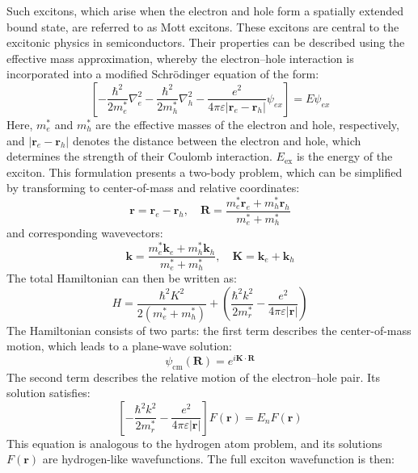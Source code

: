 Such excitons, which arise when the electron and hole form a spatially extended bound state, are referred to as Mott excitons. These excitons are central to the excitonic physics in semiconductors. Their properties can be described using the effective mass approximation, whereby the electron–hole interaction is incorporated into a modified Schrödinger equation of the form:
\begin{equation}
	\left[- \frac{\hbar^2}{2m_e^*} \nabla_e^2 - \frac{\hbar^2}{2m_h^*} \nabla_h^2 - \frac{e^2}{4\pi \varepsilon | \mathbf{r}_e - \mathbf{r}_h |} \psi_{ex} \right] = E \psi_{ex}
\end{equation}
Here, \( m_e^* \) and \( m_h^* \) are the effective masses of the electron and hole, respectively, and \( |\mathbf{r}_e - \mathbf{r}_h| \) denotes the distance between the electron and hole, which determines the strength of their Coulomb interaction. \( E_{\text{ex}} \) is the energy of the exciton.
This formulation presents a two-body problem, which can be simplified by transforming to center-of-mass and relative coordinates:
\begin{equation}
	\mathbf{r} = \mathbf{r}_e - \mathbf{r}_h, \quad \mathbf{R} = \frac{m_e^* \mathbf{r}_e + m_h^* \mathbf{r}_h}{m_e^* + m_h^*}
\end{equation}
and corresponding wavevectors:
\begin{equation}
	\mathbf{k} = \frac{m_e^* \mathbf{k}_e + m_h^* \mathbf{k}_h}{m_e^* + m_h^*}, \quad \mathbf{K} = \mathbf{k}_e + \mathbf{k}_h
\end{equation}
The total Hamiltonian can then be written as:
\begin{equation}
	H = \frac{\hbar^2 K^2}{2(m_e^* + m_h^*)} +  \left( \frac{\hbar^2 k^2}{2 m_r^*} - \frac{e^2}{4\pi \varepsilon |\mathbf{r}|} \right)
\end{equation}
The Hamiltonian consists of two parts: the first term describes the center-of-mass motion, which leads to a plane-wave solution:
\begin{equation}
	\psi_{\text{cm}}(\mathbf{R}) = e^{i \mathbf{K} \cdot \mathbf{R}}
\end{equation}
The second term describes the relative motion of the electron–hole pair. Its solution satisfies:
\begin{equation}
	\left[ - \frac{\hbar^2 k^2}{2m_r^*} - \frac{e^2}{4\pi \varepsilon |\mathbf{r}|} \right] F(\mathbf{r}) = E_n F(\mathbf{r})
\end{equation}
This equation is analogous to the hydrogen atom problem, and its solutions \( F(\mathbf{r}) \) are hydrogen-like wavefunctions. The full exciton wavefunction is then:
